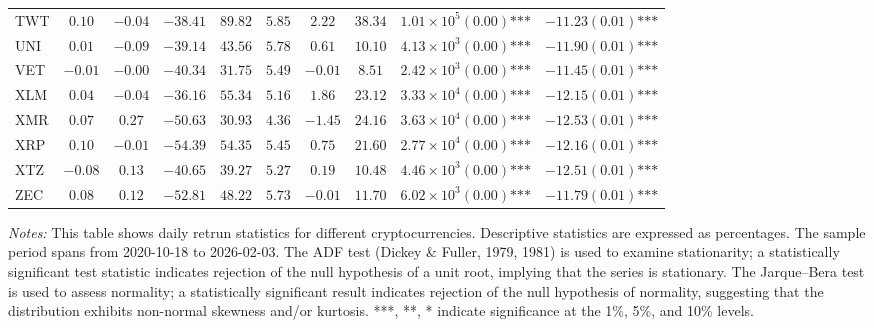 \documentclass{article}
\begin{document}
\begin{table}[htbp]
\begin{adjustbox}{width=\textwidth}
\begin{tabular}{lccccccccc}
TWT & $0.10$ & $-0.04$ & $-38.41$ & $89.82$ & $5.85$ & $2.22$ & $38.34$ & $1.01\times 10^{5}(0.00)\text{***}$ & $-11.23(0.01)\text{***}$ \\
UNI & $0.01$ & $-0.09$ & $-39.14$ & $43.56$ & $5.78$ & $0.61$ & $10.10$ & $4.13\times 10^{3}(0.00)\text{***}$ & $-11.90(0.01)\text{***}$ \\
VET & $-0.01$ & $-0.00$ & $-40.34$ & $31.75$ & $5.49$ & $-0.01$ & $8.51$ & $2.42\times 10^{3}(0.00)\text{***}$ & $-11.45(0.01)\text{***}$ \\
XLM & $0.04$ & $-0.04$ & $-36.16$ & $55.34$ & $5.16$ & $1.86$ & $23.12$ & $3.33\times 10^{4}(0.00)\text{***}$ & $-12.15(0.01)\text{***}$ \\
XMR & $0.07$ & $0.27$ & $-50.63$ & $30.93$ & $4.36$ & $-1.45$ & $24.16$ & $3.63\times 10^{4}(0.00)\text{***}$ & $-12.53(0.01)\text{***}$ \\
XRP & $0.10$ & $-0.01$ & $-54.39$ & $54.35$ & $5.45$ & $0.75$ & $21.60$ & $2.77\times 10^{4}(0.00)\text{***}$ & $-12.16(0.01)\text{***}$ \\
XTZ & $-0.08$ & $0.13$ & $-40.65$ & $39.27$ & $5.27$ & $0.19$ & $10.48$ & $4.46\times 10^{3}(0.00)\text{***}$ & $-12.51(0.01)\text{***}$ \\
ZEC & $0.08$ & $0.12$ & $-52.81$ & $48.22$ & $5.73$ & $-0.01$ & $11.70$ & $6.02\times 10^{3}(0.00)\text{***}$ & $-11.79(0.01)\text{***}$ \\
\bottomrule
\end{tabular}
\end{adjustbox}
\begin{flushleft}
{\footnotesize
\textit{Notes:} This table shows daily retrun statistics for different cryptocurrencies. Descriptive statistics are expressed as percentages. The sample period spans from 2020-10-18 to 2026-02-03. The ADF test (Dickey \& Fuller, 1979, 1981) is used to examine stationarity; a statistically significant test statistic indicates rejection of the null hypothesis of a unit root, implying that the series is stationary. The Jarque--Bera test is used to assess normality; a statistically significant result indicates rejection of the null hypothesis of normality, suggesting that the distribution exhibits non-normal skewness and/or kurtosis. ***, **, * indicate significance at the 1\%, 5\%, and 10\% levels.}
\end{flushleft}
\end{table}
\restoregeometry %
\end{document}
